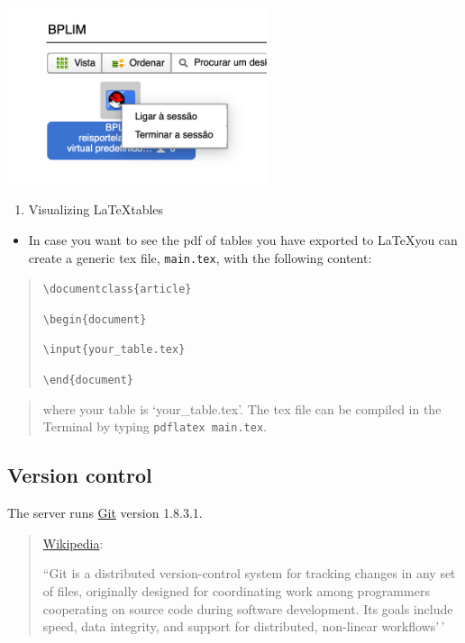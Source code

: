 \documentclass[
  11pt,
  a4paper,
]{article}
\providecommand{\tightlist}{%
  \setlength{\itemsep}{0pt}\setlength{\parskip}{0pt}}
\begin{document}
\includegraphics[width=3in,height=\textheight]{./media/logout2.png}

\begin{enumerate}
\def\labelenumi{\arabic{enumi}.}
\setcounter{enumi}{8}
\tightlist
\item
  Visualizing \LaTeX  tables
\end{enumerate}

\begin{itemize}
\tightlist
\item
  In case you want to see the pdf of tables you have exported to
  \LaTeX  you can create a generic tex file, \texttt{main.tex}, with the
  following content:
\end{itemize}

\begin{quote}
\texttt{\textbackslash{}documentclass\{article\}}

\texttt{\textbackslash{}begin\{document\}}

\texttt{\textbackslash{}input\{your\_table.tex\}}

\texttt{\textbackslash{}end\{document\}}
\end{quote}

\begin{quote}
where your table is `your\_table.tex'. The tex file can be compiled in
the Terminal by typing \texttt{pdflatex\ main.tex}.
\end{quote}

\hypertarget{version-control}{%
\subsection{Version control}\label{version-control}}

The server runs \href{https://git-scm.com/}{Git} version 1.8.3.1.

\begin{quote}
\href{https://en.wikipedia.org/wiki/Git}{Wikipedia}:

``Git is a distributed version-control system for tracking changes in
any set of files, originally designed for coordinating work among
programmers cooperating on source code during software development. Its
goals include speed, data integrity, and support for distributed,
non-linear workflows'\,'
\end{quote}
\end{document}
